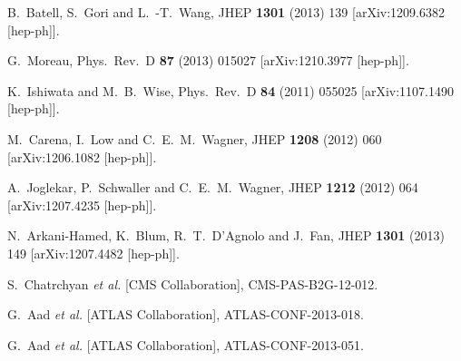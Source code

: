 \documentclass[12pt,a4paper]{article}
\begin{document}
\begin{thebibliography}{99}
  B.~Batell, S.~Gori and L.~-T.~Wang,
  JHEP {\bf 1301} (2013) 139
  [arXiv:1209.6382 [hep-ph]].

  G.~Moreau,
  Phys.\ Rev.\ D {\bf 87} (2013) 015027
  [arXiv:1210.3977 [hep-ph]].
 
  


 

  K.~Ishiwata and M.~B.~Wise,
  Phys.\ Rev.\ D {\bf 84} (2011) 055025
  [arXiv:1107.1490 [hep-ph]].

  M.~Carena, I.~Low and C.~E.~M.~Wagner,
  JHEP {\bf 1208} (2012) 060
    [arXiv:1206.1082 [hep-ph]].

  A.~Joglekar, P.~Schwaller and C.~E.~M.~Wagner,
  JHEP {\bf 1212} (2012) 064
  [arXiv:1207.4235 [hep-ph]].

  N.~Arkani-Hamed, K.~Blum, R.~T.~D'Agnolo and J.~Fan,
  JHEP {\bf 1301} (2013) 149
  [arXiv:1207.4482 [hep-ph]].




 S.~Chatrchyan {\it et al.}  [CMS Collaboration],
  CMS-PAS-B2G-12-012.

 G.~Aad {\it et al.}  [ATLAS Collaboration],
  ATLAS-CONF-2013-018.



  G.~Aad {\it et al.} [ATLAS Collaboration],
  ATLAS-CONF-2013-051.


\end{thebibliography}
\end{document}
